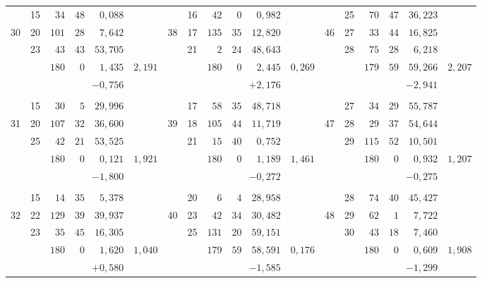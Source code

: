 \begin{center}
\begin{tabular}{|r|r|r@{\;}r@{\;}r|r||r|r|r@{\;}r@{\;}r|r||r|r|r@{\;}r@{\;}r|r|}
 & 15 & $34$ & $48$ & $0{,}088$ &  &  & 16 & $42$ & $0$ & $0{,}982$ &  &  & 25 & $70$ & $47$ & $36{,}223$ & \\
30 & 20 & $101$ & $28$ & $7{,}642$ &  & 38 & 17 & $135$ & $35$ & $12{,}820$ &  & 46 & 27 & $33$ & $44$ & $16{,}825$ & \\
 & 23 & $43$ & $43$ & $53{,}705$ &  &  & 21 & $2$ & $24$ & $48{,}643$ &  &  & 28 & $75$ & $28$ & $6{,}218$ & \\
\cline{3-5}\cline{9-11}\cline{15-17}
 &  & $180$ & $0$ & $1{,}435$ & $2{,}191$ &  &  & $180$ & $0$ & $2{,}445$ & $0{,}269$ &  &  & $179$ & $59$ & $59{,}266$ & $2{,}207$\\
 &  & \multicolumn{3}{r|}{$-0{,}756$} &  &  &  & \multicolumn{3}{r|}{$+2{,}176$} &  &  &  & \multicolumn{3}{r|}{$-2{,}941$} & \\
 &  &  &  &  &  &  &  &  &  &  &  &  &  &  &  &  & \\
 & 15 & $30$ & $5$ & $29{,}996$ &  &  & 17 & $58$ & $35$ & $48{,}718$ &  &  & 27 & $34$ & $29$ & $55{,}787$ & \\
31 & 20 & $107$ & $32$ & $36{,}600$ &  & 39 & 18 & $105$ & $44$ & $11{,}719$ &  & 47 & 28 & $29$ & $37$ & $54{,}644$ & \\
 & 25 & $42$ & $21$ & $53{,}525$ &  &  & 21 & $15$ & $40$ & $0{,}752$ &  &  & 29 & $115$ & $52$ & $10{,}501$ & \\
\cline{3-5}\cline{9-11}\cline{15-17}
 &  & $180$ & $0$ & $0{,}121$ & $1{,}921$ &  &  & $180$ & $0$ & $1{,}189$ & $1{,}461$ &  &  & $180$ & $0$ & $0{,}932$ & $1{,}207$\\
 &  & \multicolumn{3}{r|}{$-1{,}800$} &  &  &  & \multicolumn{3}{r|}{$-0{,}272$} &  &  &  & \multicolumn{3}{r|}{$-0{,}275$} & \\
 &  &  &  &  &  &  &  &  &  &  &  &  &  &  &  &  & \\
 & 15 & $14$ & $35$ & $5{,}378$ &  &  & 20 & $6$ & $4$ & $28{,}958$ &  &  & 28 & $74$ & $40$ & $45{,}427$ & \\
32 & 22 & $129$ & $39$ & $39{,}937$ &  & 40 & 23 & $42$ & $34$ & $30{,}482$ &  & 48 & 29 & $62$ & $1$ & $7{,}722$ & \\
 & 23 & $35$ & $45$ & $16{,}305$ &  &  & 25 & $131$ & $20$ & $59{,}151$ &  &  & 30 & $43$ & $18$ & $7{,}460$ & \\
\cline{3-5}\cline{9-11}\cline{15-17}
 &  & $180$ & $0$ & $1{,}620$ & $1{,}040$ &  &  & $179$ & $59$ & $58{,}591$ & $0{,}176$ &  &  & $180$ & $0$ & $0{,}609$ & $1\overset{\boldsymbol{\cdot}}{,}908$\\
 &  & \multicolumn{3}{r|}{$+0{,}580$} &  &  &  & \multicolumn{3}{r|}{$-1{,}585$} &  &  &  & \multicolumn{3}{r|}{$-1{,}299$} & \\

\end{tabular}
\end{center}
